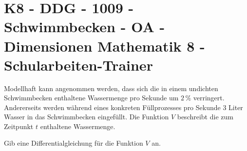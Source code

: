 \section{K8 - DDG - 1009 - Schwimmbecken - OA - Dimensionen Mathematik 8 - Schularbeiten-Trainer}

\begin{beispiel}[K8 - DDG]{1}
Modellhaft kann angenommen werden, dass sich die in einem undichten Schwimmbecken enthaltene Wassermenge pro Sekunde um $2\,\%$ verringert.\\
Andererseits werden während eines konkreten Füllprozesses pro Sekunde 3 Liter Wasser in das Schwimmbecken eingefüllt. Die Funktion $V$ beschreibt die zum Zeitpunkt $t$ enthaltene Wassermenge.

Gib eine Differentialgleichung für die Funktion $V$ an.

\end{beispiel}